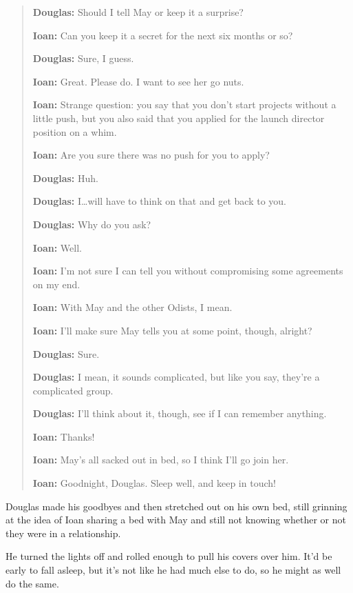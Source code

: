 \begin{quote}
\textbf{Douglas:} Should I tell May or keep it a surprise?

\textbf{Ioan:} Can you keep it a secret for the next six months or so?

\textbf{Douglas:} Sure, I guess.

\textbf{Ioan:} Great. Please do. I want to see her go nuts.

\textbf{Ioan:} Strange question: you say that you don't start projects without a little push, but you also said that you applied for the launch director position on a whim.

\textbf{Ioan:} Are you sure there was no push for you to apply?

\textbf{Douglas:} Huh.

\textbf{Douglas:} I\ldots will have to think on that and get back to you.

\textbf{Douglas:} Why do you ask?

\textbf{Ioan:} Well.

\textbf{Ioan:} I'm not sure I can tell you without compromising some agreements on my end.

\textbf{Ioan:} With May and the other Odists, I mean.

\textbf{Ioan:} I'll make sure May tells you at some point, though, alright?

\textbf{Douglas:} Sure.

\textbf{Douglas:} I mean, it sounds complicated, but like you say, they're a complicated group.

\textbf{Douglas:} I'll think about it, though, see if I can remember anything.

\textbf{Ioan:} Thanks!

\textbf{Ioan:} May's all sacked out in bed, so I think I'll go join her.

\textbf{Ioan:} Goodnight, Douglas. Sleep well, and keep in touch!
\end{quote}

Douglas made his goodbyes and then stretched out on his own bed, still grinning at the idea of Ioan sharing a bed with May and still not knowing whether or not they were in a relationship.

He turned the lights off and rolled enough to pull his covers over him. It'd be early to fall asleep, but it's not like he had much else to do, so he might as well do the same.
